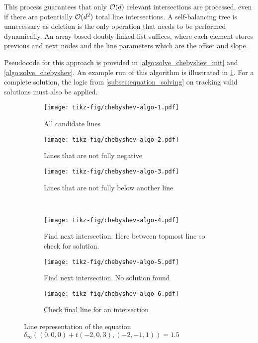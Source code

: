 This process guarantees that only \(\mathcal{O}(d)\) relevant intersections are processed, even if there are potentially \(\mathcal{O}(d^2)\) total line intersections. A self-balancing tree is unnecessary as deletion is the only operation that needs to be performed dynamically. An array-based doubly-linked list suffices, where each element stores previous and next nodes and the line parameters which are the offset and slope. 

Pseudocode for this approach is provided in \cref{algo:solve_chebyshev_init} and \cref{algo:solve_chebyshev}. An example run of this algorithm is illustrated in \cref{fig:chebyshev_algo}. For a complete solution, the logic from \cref{subsec:equation_solving} on tracking valid solutions must also be applied.

\begin{figure}
  \centering 
  \begin{subfigure}[t]{0.3\textwidth}
		\texttt{[image: tikz-fig/chebyshev-algo-1.pdf]}
    \caption{All candidate lines}
  \end{subfigure}
  \begin{subfigure}[t]{0.3\textwidth}
    \texttt{[image: tikz-fig/chebyshev-algo-2.pdf]}
    \caption{Lines that are not fully negative}
  \end{subfigure}
  \begin{subfigure}[t]{0.3\textwidth}
    \texttt{[image: tikz-fig/chebyshev-algo-3.pdf]}
    \caption{Lines that are not fully below another line}
  \end{subfigure}\\
  \begin{subfigure}[t]{0.3\textwidth}
    \texttt{[image: tikz-fig/chebyshev-algo-4.pdf]}
    \caption{Find next intersection. Here between topmost line so check for solution.}
  \end{subfigure}
  \begin{subfigure}[t]{0.3\textwidth}
    \texttt{[image: tikz-fig/chebyshev-algo-5.pdf]}
    \caption{Find next intersection. No solution found}
  \end{subfigure}
  \begin{subfigure}[t]{0.3\textwidth}
    \texttt{[image: tikz-fig/chebyshev-algo-6.pdf]}
    \caption{Check final line for an intersection}
  \end{subfigure}
  \caption{Line representation of the equation \(\delta_\infty((0,0,0) + t(-2,0,3), (-2,-1,1)) = 1.5\)}
  \label{fig:chebyshev_algo}
\end{figure}

